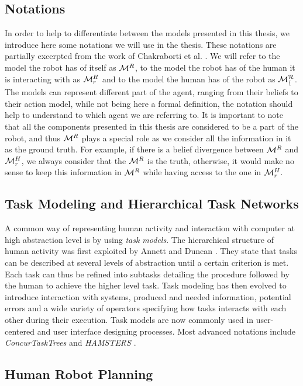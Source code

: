 \documentclass[a4paper,11pt,twoside]{StyleThese}
\begin{document}
\subsection{Notations}
In order to help to differentiate between the models presented in this thesis, we introduce here some notations we will use in the thesis. These notations are partially excerpted from the work of Chakraborti et al. \cite{chakraborti2018human}. We will refer to the model the robot has of itself as $\mathcal{M}^R$, to the model the robot has of the human it is interacting with as $\mathcal{M}^H_r$ and to the model the human has of the robot as $\mathcal{M^R_h}$. The models can represent different part of the agent, ranging from their beliefs to their action model, while not being here a formal definition, the notation should help to understand to which agent we are referring to. It is important to note that all the components presented in this thesis are considered to be a part of the robot, and thus $\mathcal{M}^R$ plays a special role as we consider all the information in it as the ground truth. For example, if there is a belief divergence between $\mathcal{M}^R$ and $\mathcal{M}^H_r$, we always consider that the $\mathcal{M}^R$ is the truth, otherwise, it would make no sense to keep this information in $\mathcal{M}^R$ while having access to the one in $\mathcal{M}^H_r$.

\subsection{Task Modeling and Hierarchical Task Networks}
A common way of representing human activity and interaction with computer at high abstraction level is by using \textit{task models}. The hierarchical structure of human activity was first exploited by Annett and Duncan \cite{annett1967task}. They state that tasks can be described at several levels of abstraction until a certain criterion is met. Each task can thus be refined into subtasks detailing the procedure followed by the human to achieve the higher level task.
Task modeling has then evolved to introduce interaction with systems, produced and needed information, potential errors and a wide variety of operators specifying how tasks interacts with each other during their execution. Task models are now commonly used in user-centered and user interface designing processes. Most advanced notations include \textit{ConcurTaskTrees} \cite{paterno2004concurtasktrees} and \textit{HAMSTERS} \cite{martinie2019analysing}. 

\subsection{Human Robot Planning}


\ifdefined{}
\else


\end{document}
